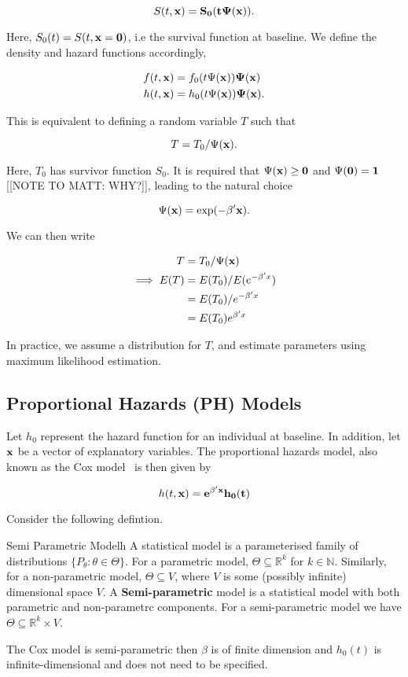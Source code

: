 \[
    S(t, \bf{x}) = S_0(t\Psi(\bf{x})).
\]

Here, $S_0(t) = S(t, \bf{x} = \bf{0})$, i.e the survival function at baseline. We define the density and hazard functions accordingly,

\begin{align*}
    f(t, \bf{x}) &= f_0(t\Psi(\bf{x}))\Psi(\bf{x}) \\
    h(t, \bf{x}) &= h_0(t\Psi(\bf{x}))\Psi(\bf{x}).
\end{align*}

This is equivalent to defining a random variable $T$ such that

\[
    T = T_0/\Psi(\bf{x}).  
\]

Here, $T_0$ has survivor function $S_0$. It is required that $\Psi(\bf{x}) \geq 0$ and $\Psi(\bf{0}) = 1$ [[NOTE TO MATT: WHY?]], leading to the natural choice 

\[
    \Psi(\bf{x}) = \exp(-\beta'x).  
\]

We can then write 

\begin{align*}
    T &= T_0/\Psi(\bf{x}) \\
    \implies E(T) &= E(T_0)/E(e^{-\beta'x}) \\
    &= E(T_0)/e^{-\beta'x} \\
    &= E(T_0)e^{\beta'x}
\end{align*}

In practice, we assume a distribution for $T$, and estimate parameters using maximum likelihood estimation. 

\subsection{Proportional Hazards (PH) Models}

Let $h_0$ represent the hazard function for an individual at baseline. In addition, let $\bf{x}$ be a vector of explanatory variables. The proportional hazards model, also known as the Cox model~\cite{cox1972} is then given by 

\begin{equation}
    h(t, \bf{x}) = e^{\beta'\bf{x}}h_0(t)
\end{equation}

Consider the following defintion.

\begin{definition}{Semi Parametric Model}{h}
    A statistical model is a parameterised family of distributions $\{P_{\theta} : \theta \in \Theta\}$. 
    For a parametric model, $\Theta \subseteq \mathbb{R}^k$ for $k \in \mathbb{N}$. Similarly, for a non-parametric model, $\Theta \subseteq V$, where $V$ is some (possibly infinite) dimensional space $V$. A \textbf{Semi-parametric} model is a statistical model with both parametric and non-parametrc components. For a semi-parametric model we have $\Theta \subseteq \mathbb{R}^k \times V$.
\end{definition}

The Cox model is semi-parametric then $\beta$ is of finite dimension and $h_0(t)$ is infinite-dimensional and does not need to be specified. 
